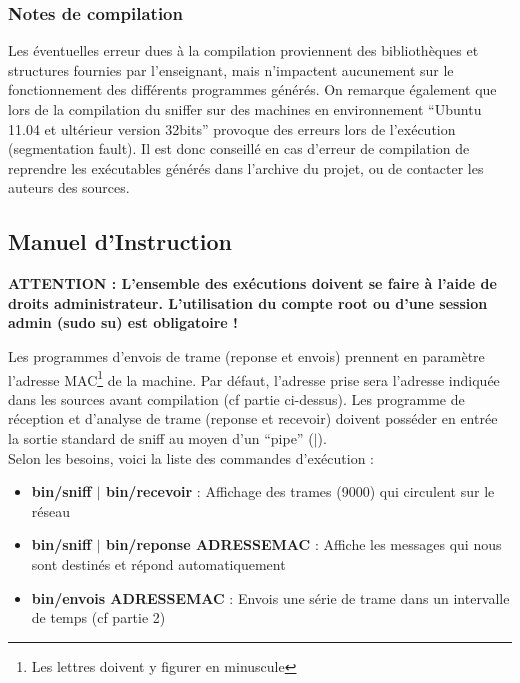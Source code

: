 \documentclass[a4paper,11pt]{article}
\begin{document}
		\subsubsection{Notes de compilation}
		Les éventuelles erreur dues à la compilation proviennent des bibliothèques et structures fournies par l'enseignant, mais n'impactent aucunement sur le fonctionnement des différents programmes générés. On remarque également que lors de la compilation du sniffer sur des machines en environnement ``Ubuntu 11.04 et ultérieur version 32bits'' provoque des erreurs lors de l'exécution (segmentation fault). Il est donc conseillé en cas d'erreur de compilation de reprendre les exécutables générés dans l'archive du projet, ou de contacter les auteurs des sources.
		\subsection{Manuel d'Instruction}
		\textbf{ATTENTION : L'ensemble des exécutions doivent se faire à l'aide de droits administrateur. L'utilisation du compte root ou d'une session admin (sudo su) est obligatoire !}
		
		
		
		Les programmes d'envois de trame (reponse et envois) prennent en paramètre l'adresse MAC\footnote{Les lettres doivent y figurer en minuscule} de la machine. Par défaut, l'adresse prise sera l'adresse indiquée dans les sources avant compilation (cf partie ci-dessus). Les programme de réception et d'analyse de trame (reponse et recevoir) doivent posséder en entrée la sortie standard de sniff au moyen d'un ``pipe'' ($|$).\\
		Selon les besoins, voici la liste des commandes d'exécution :
		\begin{itemize}
		\item \textbf{bin/sniff $|$ bin/recevoir} : Affichage des trames (9000) qui circulent sur le réseau
		\item \textbf{bin/sniff $|$ bin/reponse ADRESSEMAC} : Affiche les messages qui nous sont destinés et répond automatiquement
		\item \textbf{bin/envois ADRESSEMAC} :		 Envois une série de trame dans un intervalle de temps (cf partie 2)
		\end{itemize}
\end{document}
